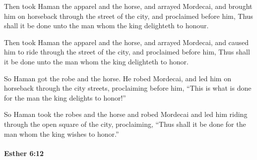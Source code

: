 			Then took Haman the apparel and the horse, and arrayed Mordecai, and brought him on horseback through the street of the city, and proclaimed before him, Thus shall it be done unto the man whom the king delighteth to honour.

			\begin{versebox}
					\item[BHS] 
					\item[LXX] 
					\item[ASV] Then took Haman the apparel and the horse, and arrayed Mordecai, and caused him to ride through the street of the city, and proclaimed before him, Thus shall it be done unto the man whom the king delighteth to honor.
					\item[NIV] So Haman got the robe and the horse. He robed Mordecai, and led him on horseback through the city streets, proclaiming before him, “This is what is done for the man the king delights to honor!”
					\item[NRSV] So Haman took the robes and the horse and robed Mordecai and led him riding through the open square of the city, proclaiming, “Thus shall it be done for the man whom the king wishes to honor.”
			\end{versebox}

		\paragraph{Esther 6:12} %
			\label{ESTHER-6-12}

